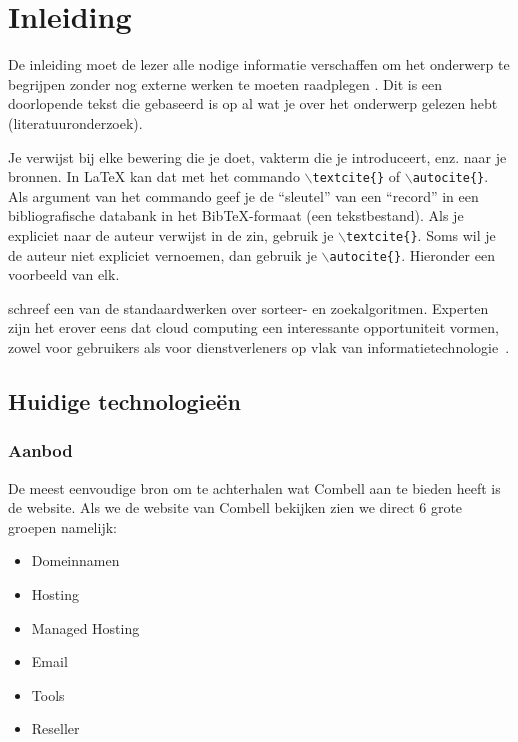 
\chapter{Inleiding}
\label{ch:inleiding}

De inleiding moet de lezer alle nodige informatie verschaffen om het onderwerp te begrijpen zonder nog externe werken te moeten raadplegen \autocite{Pollefliet2011}. Dit is een doorlopende tekst die gebaseerd is op al wat je over het onderwerp gelezen hebt (literatuuronderzoek).

Je verwijst bij elke bewering die je doet, vakterm die je introduceert, enz. naar je bronnen. In \LaTeX{} kan dat met het commando \texttt{$\backslash${textcite\{\}}} of \texttt{$\backslash${autocite\{\}}}. Als argument van het commando geef je de ``sleutel'' van een ``record'' in een bibliografische databank in het Bib\TeX{}-formaat (een tekstbestand). Als je expliciet naar de auteur verwijst in de zin, gebruik je \texttt{$\backslash${}textcite\{\}}.
Soms wil je de auteur niet expliciet vernoemen, dan gebruik je \texttt{$\backslash${}autocite\{\}}. Hieronder een voorbeeld van elk.

\textcite{Knuth1998} schreef een van de standaardwerken over sorteer- en zoekalgoritmen. Experten zijn het erover eens dat cloud computing een interessante opportuniteit vormen, zowel voor gebruikers als voor dienstverleners op vlak van informatietechnologie~\autocite{Creeger2009}.

\section{Huidige technologieën}
\label{sec:stand-van-zaken}


\subsection{Aanbod}

De meest eenvoudige bron om te achterhalen wat Combell aan te bieden heeft is de website. Als we de website van Combell bekijken zien we direct 6 grote groepen namelijk:

\begin{itemize}  
	\item Domeinnamen
	\item Hosting
	\item Managed Hosting
	\item Email
	\item Tools
	\item Reseller
\end{itemize}


